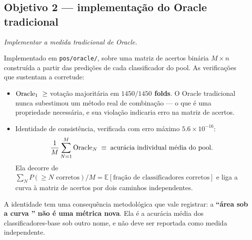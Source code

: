 \subsection{Objetivo 2 --- implementação do Oracle tradicional}

\textit{Implementar a medida tradicional de Oracle.}

Implementado em \texttt{pos/oracle/}, sobre uma matriz de acertos binária
$M \times n$ construída a partir das predições de cada classificador do pool. As
verificações que sustentam a corretude:

\begin{itemize}
\item $\text{Oracle}_{1}\ \ge$ votação majoritária em \textbf{$1450/1450$ folds}. O Oracle
tradicional nunca subestimou um método real de combinação --- o que é uma
propriedade necessária, e sua violação indicaria erro na matriz de acertos.

\item Identidade de consistência, verificada com erro máximo $5.6\times10^{-16}$:
\begin{equation}
\frac{1}{M}\sum_{N=1}^{M}\text{Oracle}_{N} \;\equiv\; \text{acurácia individual média do pool}.
\end{equation}
Ela decorre de $\sum_N P(\ge N \text{ corretos})/M = \mathbb{E}[\text{fração de
classificadores corretos}]$ e liga a curva à matriz de acertos por dois caminhos
independentes.
\end{itemize}

A identidade tem uma consequência metodológica que vale registrar: a
\textbf{``área sob a curva '' não é uma métrica nova}. Ela é a acurácia média
dos classificadores-base sob outro nome, e não deve ser reportada como medida
independente.
